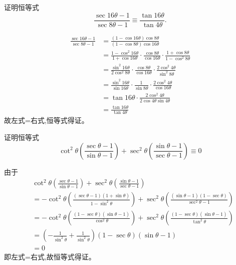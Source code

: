 \begin{questions}
    \question 证明恒等式
    \[
    \frac{\sec 16\theta - 1}{\sec 8\theta - 1} \equiv \frac{\tan 16\theta}{\tan 4\theta}.
    \]
    \begin{solution}
        \begin{align*}
        \frac{\sec 16\theta - 1}{\sec 8\theta - 1}
        &= \frac{(1-\cos 16\theta)\cos 8\theta}{(1-\cos 8\theta)\cos 16\theta} \\
        &= \frac{1-\cos^2 16\theta}{1+\cos 16\theta} \cdot \frac{\cos 8\theta}{\cos 16\theta} \cdot \frac{1+\cos 8\theta}{1-\cos^2 8\theta} \\
        &= \frac{\sin^2 16\theta}{2\cos^2 8\theta} \cdot \frac{\cos 8\theta}{\cos 16\theta} \cdot \frac{2\cos^2 4\theta}{\sin^2 8\theta}\\
        &= \frac{\sin^2 16\theta}{\sin 16\theta} \cdot \frac{1}{\sin 8\theta} \cdot \frac{2\cos^2 4\theta}{\cos 16\theta}\\
        &= \tan 16 \theta \cdot \frac{2 \cos^2 4\theta}{2\cos 4 \theta \sin 4 \theta}\\
        &= \frac{\tan16\theta}{\tan 4\theta}
        \end{align*}
        故左式=右式,恒等式得证。
    \end{solution}

    \question 证明恒等式
    \[
    \cot^2 \theta \left( \frac{\sec \theta - 1}{\sin \theta - 1} \right) + \sec^2 \theta \left( \frac{\sin \theta - 1}{\sec \theta - 1} \right) \equiv 0
    \]
    \begin{solution}
        由于
        \begin{align*}
        &\cot^2 \theta \left( \frac{\sec \theta - 1}{\sin \theta - 1} \right) + \sec^2 \theta \left( \frac{\sin \theta - 1}{\sec \theta - 1} \right) \\
        &= -\cot^2 \theta \left( \frac{(\sec \theta - 1)(1+\sin \theta)}{1 - \sin^2 \theta} \right) + \sec^2 \theta \left( \frac{(\sin \theta - 1)(1-\sec \theta)}{\sec^2 \theta-1} \right) \\
        &= -\cot^2 \theta \left( \frac{(1 - \sec \theta)(\sin \theta - 1)}{\cos^2 \theta} \right) + \sec^2 \theta \left( \frac{(1 - \sec \theta)(\sin \theta - 1)}{\tan^2 \theta} \right) \\
        &= \left( -\frac{1}{\sin^2 \theta} + \frac{1}{\sin^2 \theta} \right) (1 - \sec \theta)(\sin \theta - 1) \\
        &= 0
        \end{align*}
        即左式=右式,故恒等式得证。
    \end{solution}


\end{questions}

